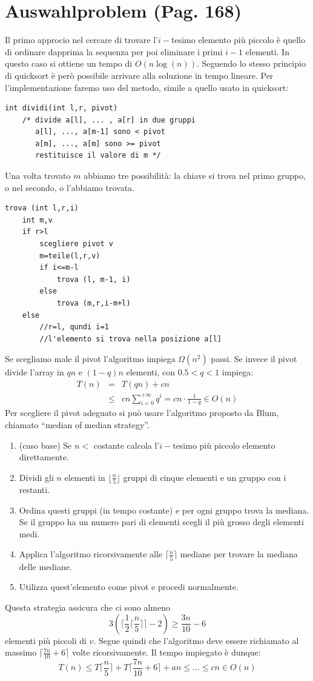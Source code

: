 \documentclass[a4paper]{book}
\newcommand{\lstIndent}{4}
\begin{document}
\section{Auswahlproblem (Pag. 168)}
Il primo approcio nel cercare di trovare l'$i-$tesimo elemento più piccolo è quello di ordinare dapprima la sequenza per poi eliminare i primi $i-1$ elementi. In questo caso si ottiene un tempo di $O(n \log (n))$. Seguendo lo stesso principio di quicksort è però possibile arrivare alla soluzione in tempo lineare. Per l'implementazione faremo uso del metodo, simile a quello usato in quicksort:
\begin{lstlisting}[tabsize=\lstIndent]
int dividi(int l,r, pivot)
	/* divide a[l], ... , a[r] in due gruppi
	   a[l], ..., a[m-1] sono < pivot
	   a[m], ..., a[m] sono >= pivot
	   restituisce il valore di m */
\end{lstlisting}
Una volta trovato $m$ abbiamo tre possibilità: la chiave si trova nel primo gruppo, o nel secondo, o l'abbiamo trovata.
\begin{lstlisting}[tabsize=\lstIndent]
trova (int l,r,i)
	int m,v
	if r>l
		scegliere pivot v
		m=teile(l,r,v)
		if i<=m-l
			trova (l, m-1, i)
		else
			trova (m,r,i-m+l)
	else
		//r=l, qundi i=1
		//l'elemento si trova nella posizione a[l]	 			
\end{lstlisting}
Se scegliamo male il pivot l'algoritmo impiega $\Omega (n^2)$ passi. Se invece il pivot divide l'array in $qn$ e $(1-q)n$ elementi, con $0.5<q<1$ impiega:
\begin{eqnarray}
T(n) &=& T(qn)+cn \nonumber \\
& \leq & cn \sum_{i=0}^{+\infty} q^i = cn \cdot\frac{1}{1-q} \in O(n)
\end{eqnarray}
Per scegliere il pivot adeguato si può usare l'algoritmo proposto da Blum, chiamato ``median of median strategy''.
\begin{enumerate}
\item (caso base) Se $n<$ costante calcola l'$i-$tesimo più piccolo elemento direttamente.
\item Dividi gli $n$ elementi in $\lfloor \frac{n}{5} \rfloor$ gruppi di cinque elementi e un gruppo con i restanti. 
\item Ordina questi gruppi (in tempo costante) e per ogni gruppo trova la mediana. Se il gruppo ha un numero pari di elementi scegli il più grosso degli elementi medi. 
\item Applica l'algoritmo ricorsivamente alle $\lceil \frac{n}{5} \rceil$ mediane per trovare la mediana delle mediane.
\item Utilizza quest'elemento come pivot e procedi normalmente.
\end{enumerate}
Questa strategia assicura che ci sono almeno 
$$ 3\left(\lceil \frac{1}{2} \lceil \frac{n}{5} \rceil \rceil -2\right) \geq \frac{3n}{10} -6$$
elementi più piccoli di $v$. Segue quindi che l'algoritmo deve essere richiamato al massimo $ \lceil \frac{7n}{10} + 6 \rceil$ volte ricorsivamente. Il tempo impiegato è dunque:
$$ T(n) \leq T\lceil \frac{n}{5} \rceil +T \lceil \frac{7n}{10} +6 \rceil + an \leq ... \leq cn \in O(n) $$
\end{document}
